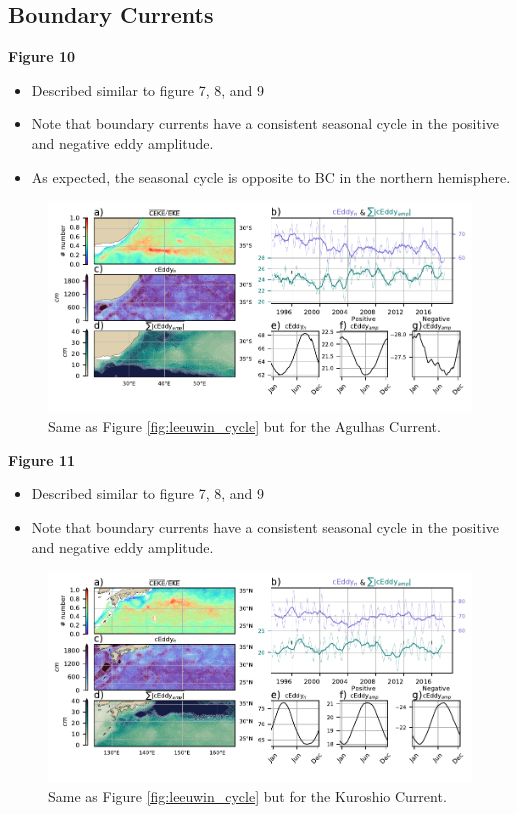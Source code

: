 \documentclass[draft,linenumbers]{agujournal2019}
\begin{document}
	\subsection{Boundary Currents}
	\label{subsec:CE_regional_stats}


	\textbf{Figure 10}
	\begin{itemize}
		\item Described similar to figure 7, 8, and 9
		\item Note that boundary currents have a consistent seasonal cycle in the positive and negative eddy amplitude.
		\item As expected, the seasonal cycle is opposite to BC in the northern hemisphere.
	\end{itemize}

	\begin{figure}
	    \centering
	    \includegraphics[width=1\textwidth]{figures/regional_ratios_and_stats_V3_2.pdf}
	    \caption{Same as Figure \ref{fig:leeuwin_cycle} but for the Agulhas Current.}
	    \label{fig:south_atlantic_cycle}
	\end{figure}

	\textbf{Figure 11}
	\begin{itemize}
		\item Described similar to figure 7, 8, and 9
		\item Note that boundary currents have a consistent seasonal cycle in the positive and negative eddy amplitude.
	\end{itemize}

	\begin{figure}
	    \centering
	    \includegraphics[width=1\textwidth]{figures/regional_ratios_and_stats_V3_4.pdf}
	    \caption{Same as Figure \ref{fig:leeuwin_cycle} but for the Kuroshio Current.}
	    \label{fig:south_atlantic_cycle}
	\end{figure}
\end{document}
